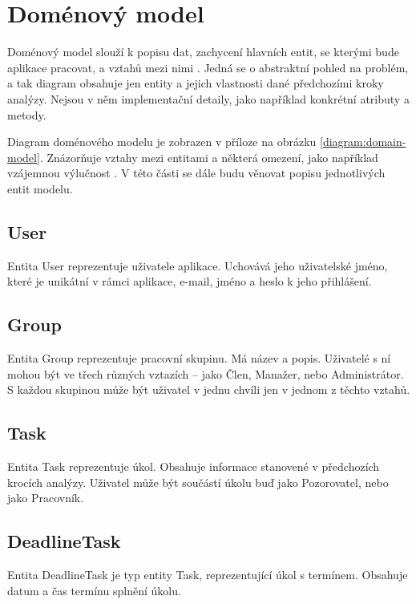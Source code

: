 \documentclass[thesis=B,czech]{FITthesis}[2012/06/26]
\begin{document}
			
			
			
			
		
		

		
	\section{Doménový model}
		\label{sec:domain-model}
		Doménový model slouží k popisu dat, zachycení hlavních entit, se kterými bude aplikace pracovat, a vztahů mezi nimi \cite{domain-model}. Jedná se o abstraktní pohled na problém, a tak diagram obsahuje jen entity a jejich vlastnosti dané předchozími kroky analýzy. Nejsou v něm implementační detaily, jako například konkrétní atributy a metody.
		
		Diagram doménového modelu je zobrazen v příloze na obrázku \ref{diagram:domain-model}. Znázorňuje vztahy mezi entitami a některá omezení, jako například vzájemnou výlučnost \cite{domain-model-multiple-association}. V této části se dále budu věnovat popisu jednotlivých entit modelu.
		
		\subsection{User}
			Entita User reprezentuje uživatele aplikace. Uchovává jeho uživatelské jméno, které je unikátní v rámci aplikace, e-mail, jméno a heslo k jeho přihlášení.
			
		\subsection{Group}
			Entita Group reprezentuje pracovní skupinu. Má název a popis. Uživatelé s ní mohou být ve třech různých vztazích -- jako Člen, Manažer, nebo Administrátor. S každou skupinou může být uživatel v jednu chvíli jen v jednom z těchto vztahů.
		
		\subsection{Task}
			Entita Task reprezentuje úkol. Obsahuje informace stanovené v předchozích krocích analýzy. Uživatel může být součástí úkolu buď jako Pozorovatel, nebo jako Pracovník.
		
		\subsection{DeadlineTask}
			Entita DeadlineTask je typ entity Task, reprezentující úkol s termínem. Obsahuje datum a čas termínu splnění úkolu.
		
\end{document}
